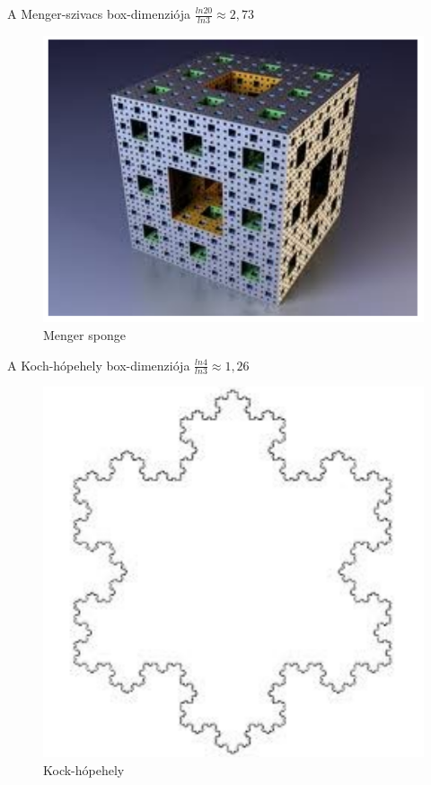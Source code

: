 A Menger-szivacs box-dimenziója $\frac{ln20}{ln3}\approx2,73$

\begin{figure}[H]
	\centering
	\includegraphics[scale=0.3]{Images/Menger-sponge.png}
	\caption{Menger sponge}	
\end{figure}

A Koch-hópehely box-dimenziója $\frac{ln4}{ln3}\approx1,26$

\begin{figure}[H]
	\centering
	\includegraphics[scale=0.3]{Images/Kock-hopehely.png}
	\caption{Kock-hópehely}	
\end{figure}


